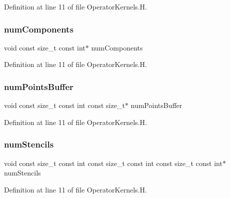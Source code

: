 Definition at line 11 of file Operator\+Kernels.\+H.

\hypertarget{OperatorKernels_8H_ad7e917240c44acf7de50a3cc9784e675}{}\label{OperatorKernels_8H_ad7e917240c44acf7de50a3cc9784e675} 
\subsubsection{\texorpdfstring{num\+Components}{numComponents}}
{\footnotesize\ttfamily void const size\+\_\+t const int$\ast$ num\+Components}



Definition at line 11 of file Operator\+Kernels.\+H.

\hypertarget{OperatorKernels_8H_aab9b71ed3bca7e28d7b21bee0d833084}{}\label{OperatorKernels_8H_aab9b71ed3bca7e28d7b21bee0d833084} 
\subsubsection{\texorpdfstring{num\+Points\+Buffer}{numPointsBuffer}}
{\footnotesize\ttfamily void const size\+\_\+t const int const size\+\_\+t$\ast$ num\+Points\+Buffer}



Definition at line 11 of file Operator\+Kernels.\+H.

\hypertarget{OperatorKernels_8H_a3ebb77d78da88e132f012ab6788ff123}{}\label{OperatorKernels_8H_a3ebb77d78da88e132f012ab6788ff123} 
\subsubsection{\texorpdfstring{num\+Stencils}{numStencils}}
{\footnotesize\ttfamily void const size\+\_\+t const int const size\+\_\+t const int const size\+\_\+t const int$\ast$ num\+Stencils}



Definition at line 11 of file Operator\+Kernels.\+H.

\hypertarget{OperatorKernels_8H_a728b4cc4b0d0125e2104144326d115da}{}\label{OperatorKernels_8H_a728b4cc4b0d0125e2104144326d115da} 
